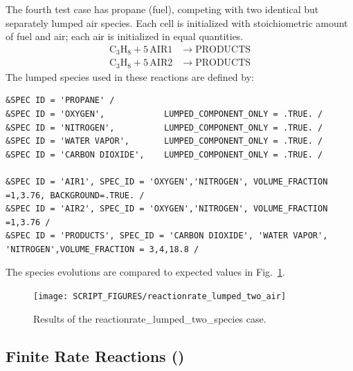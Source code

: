 \documentclass[11pt]{book}
\begin{document}
The fourth test case has propane (fuel), competing with two identical but separately lumped air species. Each cell is initialized with stoichiometric amount of fuel and air; each air is initialized in equal quantities.
\begin{align}\label{eq:lumped_2_air}
\mathrm{C_3H_8 + 5 \, AIR1} &\rightarrow  \mathrm{PRODUCTS} \\
\nonumber \mathrm{C_3H_8 + 5 \, AIR2} &\rightarrow \mathrm{PRODUCTS}
\end{align}
The lumped species used in these reactions are defined by:
\begin{lstlisting}
&SPEC ID = 'PROPANE' /
&SPEC ID = 'OXYGEN',            LUMPED_COMPONENT_ONLY = .TRUE. /
&SPEC ID = 'NITROGEN',          LUMPED_COMPONENT_ONLY = .TRUE. /
&SPEC ID = 'WATER VAPOR',       LUMPED_COMPONENT_ONLY = .TRUE. /
&SPEC ID = 'CARBON DIOXIDE',    LUMPED_COMPONENT_ONLY = .TRUE. /

&SPEC ID = 'AIR1', SPEC_ID = 'OXYGEN','NITROGEN', VOLUME_FRACTION =1,3.76, BACKGROUND=.TRUE. /
&SPEC ID = 'AIR2', SPEC_ID = 'OXYGEN','NITROGEN', VOLUME_FRACTION =1,3.76 /
&SPEC ID = 'PRODUCTS', SPEC_ID = 'CARBON DIOXIDE', 'WATER VAPOR', 'NITROGEN',VOLUME_FRACTION = 3,4,18.8 /
\end{lstlisting}
The species evolutions are compared to expected values in Fig.~\ref{fig:reactionrate_lumped_two_air}.
\begin{figure}[!ht]
\centering
\texttt{[image: SCRIPT\_FIGURES/reactionrate\_lumped\_two\_air]}
\caption[Results of the {\ct reactionrate\_lumped\_two\_species} case]{Results of the {\ct reactionrate\_lumped\_two\_species} case.}
\label{fig:reactionrate_lumped_two_air}
\end{figure}

\clearpage

\subsection{Finite Rate Reactions (\texorpdfstring{}{reactionrate\_arrhenius})}
\label{finite_rate_reactions}
\label{reactionrate_arrhenius_equilibrium}
\label{reactionrate_arrhenius_0order_1step}
\label{reactionrate_arrhenius_2order_1step}
\label{reactionrate_arrhenius_1p75order_2step}
\label{reactionrate_arrhenius_1p75order_2stepr}
\end{document}
